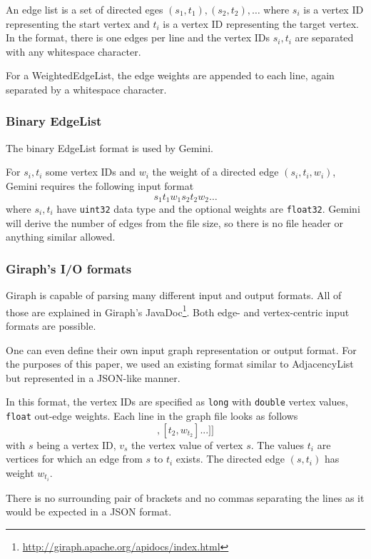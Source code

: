 An edge list is a set of directed eges $(s_1,t_1),(s_2,t_2),\ldots$ where $s_i$ is a vertex ID representing the start vertex and $t_i$ is a vertex ID representing the target vertex.
In the format, there is one edges per line and the vertex IDs $s_i, t_i$ are separated with any whitespace character.

For a WeightedEdgeList, the edge weights are appended to each line, again separated by a whitespace character.

\subsubsection{Binary EdgeList}
The binary EdgeList format is used by Gemini.

For $s_i, t_i$ some vertex IDs and $w_i$ the weight of a directed edge $(s_i,t_i, w_i)$, Gemini requires the following input format
\begin{equation*}
	s_1t_1w_1s_2t_2w_2\ldots
\end{equation*}
where $s_i,t_i$ have \texttt{uint32} data type and the optional weights are \texttt{float32}.
Gemini will derive the number of edges from the file size, so there is no file header or anything similar allowed.

\subsubsection{Giraph's I/O formats}
Giraph is capable of parsing many different input and output formats. All of those are explained in Giraph's JavaDoc\footnote{\url{http://giraph.apache.org/apidocs/index.html}}.
Both edge- and vertex-centric input formats are possible.

One can even define their own input graph representation or output format. For the purposes of this paper, we used an existing format similar to AdjacencyList but represented in a JSON-like manner.

In this format, the vertex IDs are specified as \texttt{long} with \texttt{double} vertex values, \texttt{float} out-edge weights.
Each line in the graph file looks as follows
\begin{equation*}
	[s,v_s,[[t_1, w_{t_1}], [t_2, w_{t_2}]...]]
\end{equation*}
with $s$ being a vertex ID, $v_s$ the vertex value of vertex $s$. The values $t_i$ are vertices for which an edge from $s$ to $t_i$ exists. The directed edge $(s,t_i)$ has weight $w_{t_i}$.

There is no surrounding pair of brackets and no commas separating the lines as it would be expected in a JSON format.
